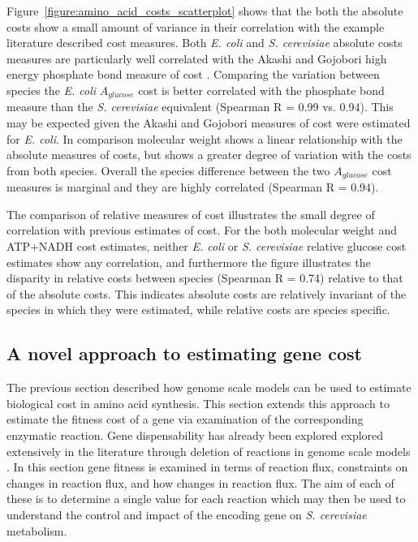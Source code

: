 Figure~\ref{figure:amino_acid_costs_scatterplot} shows that the both the absolute costs show a small amount of variance in their correlation with the example literature described cost measures. Both \emph{E. coli} and \emph{S. cerevisiae} absolute costs measures are particularly well correlated with the Akashi and Gojobori high energy phosphate bond measure of cost \cite{akashi2002}. Comparing the variation between species the \emph{E. coli} $A_{glucose}$ cost is better correlated with the phosphate bond measure than the \emph{S. cerevisiae } equivalent (Spearman R = 0.99 vs. 0.94). This may be expected given the Akashi and Gojobori measures of cost were estimated for \emph{E. coli}. In comparison molecular weight shows a linear relationship with the absolute measures of costs, but shows a greater degree of variation with the costs from both species. Overall the species difference between the two $A_{glucose}$ cost measures is marginal and they are highly correlated (Spearman R = 0.94).

The comparison of relative measures of cost illustrates the small degree of correlation with previous estimates of cost. For the both molecular weight and ATP+NADH cost estimates, neither \emph{E. coli} or \emph{S. cerevisiae} relative glucose cost estimates show any correlation, and furthermore the figure illustrates the disparity in relative costs between species (Spearman R = 0.74) relative to that of the absolute costs. This indicates absolute costs are relatively invariant of the species in which they were estimated, while relative costs are species specific.

\subsection{A novel approach to estimating gene cost}%

The previous section described how genome scale models can be used to estimate biological cost in amino acid synthesis. This section extends this approach to estimate the fitness cost of a gene via examination of the corresponding enzymatic reaction. Gene dispensability has already been explored explored extensively in the literature through deletion of reactions in genome scale models \cite{pal2006,becker2008,papp2004,wang2009}. In this section gene fitness is examined in terms of reaction flux, constraints on changes in reaction flux, and how changes in reaction flux. The aim of each of these is to determine a single value for each reaction which may then be used to understand the control and impact of the encoding gene on \emph{S. cerevisiae} metabolism.

